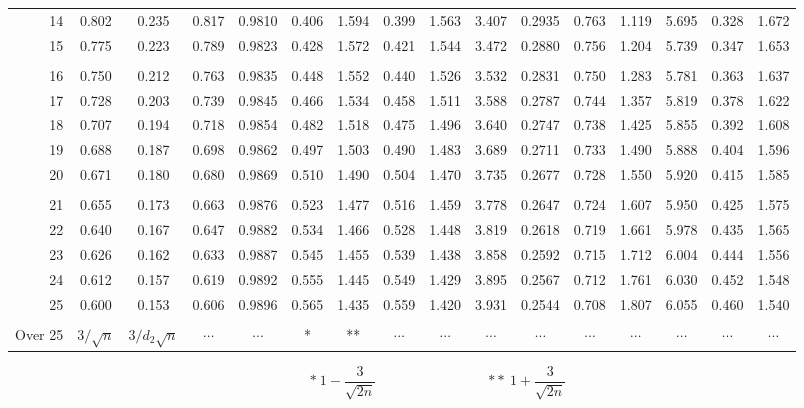 ﻿\documentclass{article}
\begin{document}
\begin{center}
\begin{tabular}{|r|c|c|c|c|c|c|c|c|c|c|c|c|c|c|c|}
    14 & 0.802 & 0.235 & 0.817 & 0.9810 & 0.406 & 1.594 & 0.399 & 1.563
       & 3.407 & 0.2935 & 0.763 & 1.119 & 5.695 & 0.328 & 1.672 \\
    15 & 0.775 & 0.223 & 0.789 & 0.9823 & 0.428 & 1.572 & 0.421 & 1.544
       & 3.472 & 0.2880 & 0.756 & 1.204 & 5.739 & 0.347 & 1.653 \\
       &       &        &       &       &       &       &       &
       &       &        &       &       &       &       &       \\
    16 & 0.750 & 0.212 & 0.763 & 0.9835 & 0.448 & 1.552 & 0.440 & 1.526
       & 3.532 & 0.2831 & 0.750 & 1.283 & 5.781 & 0.363 & 1.637 \\
    17 & 0.728 & 0.203 & 0.739 & 0.9845 & 0.466 & 1.534 & 0.458 & 1.511
       & 3.588 & 0.2787 & 0.744 & 1.357 & 5.819 & 0.378 & 1.622 \\
    18 & 0.707 & 0.194 & 0.718 & 0.9854 & 0.482 & 1.518 & 0.475 & 1.496
       & 3.640 & 0.2747 & 0.738 & 1.425 & 5.855 & 0.392 & 1.608 \\
    19 & 0.688 & 0.187 & 0.698 & 0.9862 & 0.497 & 1.503 & 0.490 & 1.483
       & 3.689 & 0.2711 & 0.733 & 1.490 & 5.888 & 0.404 & 1.596 \\
    20 & 0.671 & 0.180 & 0.680 & 0.9869 & 0.510 & 1.490 & 0.504 & 1.470
       & 3.735 & 0.2677 & 0.728 & 1.550 & 5.920 & 0.415 & 1.585 \\
       &       &        &       &       &       &       &       &
       &       &        &       &       &       &       &       \\
    21 & 0.655 & 0.173 & 0.663 & 0.9876 & 0.523 & 1.477 & 0.516 & 1.459
       & 3.778 & 0.2647 & 0.724 & 1.607 & 5.950 & 0.425 & 1.575 \\
    22 & 0.640 & 0.167 & 0.647 & 0.9882 & 0.534 & 1.466 & 0.528 & 1.448
       & 3.819 & 0.2618 & 0.719 & 1.661 & 5.978 & 0.435 & 1.565 \\
    23 & 0.626 & 0.162 & 0.633 & 0.9887 & 0.545 & 1.455 & 0.539 & 1.438
       & 3.858 & 0.2592 & 0.715 & 1.712 & 6.004 & 0.444 & 1.556 \\
    24 & 0.612 & 0.157 & 0.619 & 0.9892 & 0.555 & 1.445 & 0.549 & 1.429
       & 3.895 & 0.2567 & 0.712 & 1.761 & 6.030 & 0.452 & 1.548 \\
    25 & 0.600 & 0.153 & 0.606 & 0.9896 & 0.565 & 1.435 & 0.559 & 1.420
       & 3.931 & 0.2544 & 0.708 & 1.807 & 6.055 & 0.460 & 1.540 \\
       &       &        &       &       &       &       &       &
       &       &        &       &       &       &       &       \\
    Over 25 & $3/\sqrt{n}$ & $3/d_2\sqrt{n}$ & $\cdots$ & $\cdots$ & * & ** 
       & $\cdots$ & $\cdots$ & $\cdots$ & $\cdots$ & $\cdots$ & $\cdots$ 
       & $\cdots$ & $\cdots$ & $\cdots$ \\ \hline
  \end{tabular}
  \[ *\ 1-\frac{3}{\sqrt{2n}} \qquad\qquad\qquad\qquad
     \mathrm{**}\ 1+\frac{3}{\sqrt{2n}} \]
\end{center}
\end{document}
